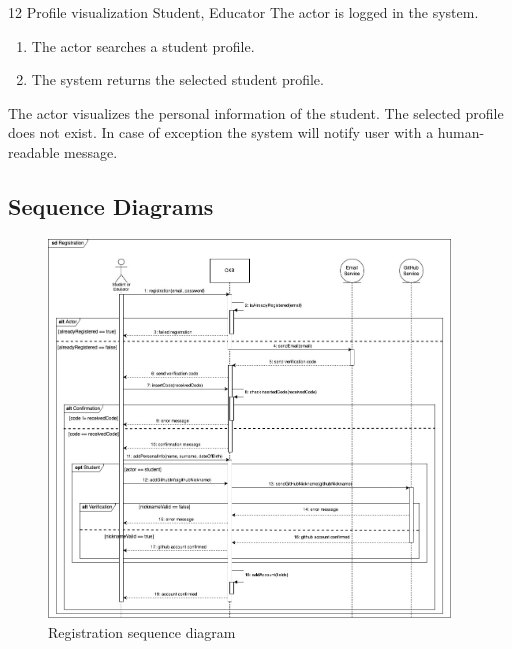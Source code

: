 \clearpage

\usecase
{12}
{Profile visualization} %
{Student, Educator} %
{The actor is logged in the system.} %
{ %
    \begin{enumerate}
        \item The actor searches a student profile.
        \item The system returns the selected student profile.
    \end{enumerate}
}
{The actor visualizes the personal information of the student.} %
{ %
 The selected profile does not exist. 
}
{ %
In case of exception the system will notify user with a human-readable message.
}

\subsection{Sequence Diagrams}
\begin{figure}[H]
    \centering
    \includegraphics[width=0.95\textwidth]{images/seq_diagrams/Registration.jpg}
    \caption{Registration sequence diagram}
\end{figure}
\clearpage

